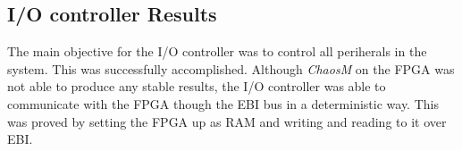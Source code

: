 \subsection{I/O controller Results}

The main objective for the I/O controller was to control all periherals in the system.
This was successfully accomplished. Although \textit{ChaosM} on the FPGA was not able
to produce any stable results, the I/O controller was able to communicate with the
FPGA though the EBI bus in a deterministic way. This was proved by setting the
FPGA up as RAM and writing and reading to it over EBI.
